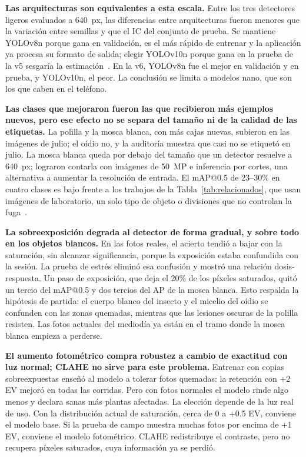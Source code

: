 \documentclass[sensors,article,submit,pdftex,moreauthors]{Definitions/mdpi}
\begin{document}
{\color{blue} \textbf{Las arquitecturas son equivalentes a esta escala.} Entre los tres detectores ligeros evaluados a 640~px, las diferencias entre arquitecturas fueron menores que la variación entre semillas y que el IC del conjunto de prueba.} {\color{blue} Se mantiene YOLOv8n porque gana en validación, es el más rápido de entrenar y la aplicación ya procesa su formato de salida; elegir YOLOv10n porque gana en la prueba de la v5 sesgaría la estimación~\cite{Kapoor2023}.} {\color{blue} En la v6, YOLOv8n fue el mejor en validación y en prueba, y YOLOv10n, el peor.} {\color{blue} La conclusión se limita a modelos nano, que son los que caben en el teléfono.}

{\color{blue} \textbf{Las clases que mejoraron fueron las que recibieron más ejemplos nuevos, pero ese efecto no se separa del tamaño ni de la calidad de las etiquetas.} La polilla y la mosca blanca, con más cajas nuevas, subieron en las imágenes de julio; el oídio no, y la auditoría muestra que casi no se etiquetó en julio.} {\color{blue} La mosca blanca queda por debajo del tamaño que un detector resuelve a 640~px;} {\color{blue} \citet{Zhao2025} lograron contarla con imágenes de 50~MP e inferencia por cortes, una alternativa a aumentar la resolución de entrada.} {\color{blue} El mAP@0.5 de 23--30\% en cuatro clases es bajo frente a los trabajos de la Tabla~\ref{tab:relacionados}, que usan imágenes de laboratorio, un solo tipo de objeto o divisiones que no controlan la fuga~\cite{Gerz2025}.}

{\color{blue} \textbf{La sobreexposición degrada al detector de forma gradual, y sobre todo en los objetos blancos.} En las fotos reales, el acierto tendió a bajar con la saturación, sin alcanzar significancia, porque la exposición estaba confundida con la sesión.} {\color{blue} La prueba de estrés eliminó esa confusión y mostró una relación dosis-respuesta.} {\color{blue} Un paso de exposición, que deja el 20\% de los píxeles saturados, quitó un tercio del mAP@0.5 y dos tercios del AP de la mosca blanca.} {\color{blue} Esto respalda la hipótesis de partida: el cuerpo blanco del insecto y el micelio del oídio se confunden con las zonas quemadas, mientras que las lesiones oscuras de la polilla resisten.} {\color{blue} Las fotos actuales del mediodía ya están en el tramo donde la mosca blanca empieza a perderse.}

{\color{blue} \textbf{El aumento fotométrico compra robustez a cambio de exactitud con luz normal; CLAHE no sirve para este problema.} Entrenar con copias sobreexpuestas enseñó al modelo a tolerar fotos quemadas: la retención con +2 EV mejoró en todas las corridas.} {\color{blue} Pero con fotos normales el modelo rinde algo menos y declara sanas más plantas afectadas.} {\color{blue} La elección depende de la luz real de uso.} {\color{blue} Con la distribución actual de saturación, cerca de 0 a +0.5 EV, conviene el modelo base.} {\color{blue} Si la prueba de campo muestra muchas fotos por encima de +1 EV, conviene el modelo fotométrico.} {\color{blue} CLAHE redistribuye el contraste, pero no recupera píxeles saturados, cuya información ya se perdió.}
\end{document}
